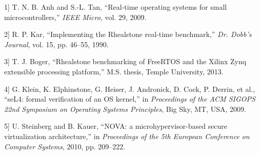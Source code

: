 \protect{}\label{cite:1-1}

\noindent {[}1{]} T. N. B. Anh and S.-L. Tan, ``Real-time operating systems for small microcontrollers,'' \textit{IEEE Micro}, vol. 29, 2009.

\protect{}\label{cite:1-2}

\noindent {[}2{]} R. P. Kar, ``Implementing the Rhealstone real-time benchmark,'' \textit{Dr. Dobb's Journal}, vol. 15, pp. 46--55, 1990.

\protect{}\label{cite:1-3}

\noindent {[}3{]} T. J. Boger, ``Rhealstone benchmarking of FreeRTOS and the Xilinx Zynq extensible processing platform,'' M.S. thesis, Temple University, 2013.

\protect{}\label{cite:1-4}

\noindent {[}4{]} G. Klein, K. Elphinstone, G. Heiser, J. Andronick, D. Cock, P. Derrin, et al., ``seL4: formal verification of an OS kernel,'' in \textit{Proceedings of the ACM SIGOPS 22nd Symposium on Operating Systems Principles}, Big Sky, MT, USA, 2009.

\protect{}\label{cite:1-5}

\noindent {[}5{]} U. Steinberg and B. Kauer, ``NOVA: a microhypervisor-based secure virtualization architecture,'' in \textit{Proceedings of the 5th European Conference on Computer Systems}, 2010, pp. 209--222.


